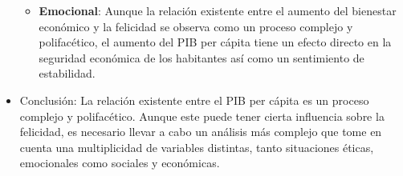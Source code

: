 \documentclass[12pt,oneside,letterpaper,spanish]{article}
\begin{document}
\begin{itemize}
\begin{itemize}
        \item \textbf{Emocional}: Aunque la relación existente entre el aumento del bienestar económico y la felicidad se observa como un proceso complejo y polifacético, el aumento del PIB per cápita tiene un efecto directo en la seguridad económica de los habitantes así como un sentimiento de estabilidad.
    \end{itemize}
    \item Conclusión: La relación existente entre el PIB per cápita es un proceso complejo y polifacético. Aunque este puede tener cierta influencia sobre la felicidad, es necesario llevar a cabo un análisis más complejo que tome en cuenta una multiplicidad de variables distintas, tanto situaciones éticas, emocionales como sociales y económicas.
\end{itemize}
\end{document}

